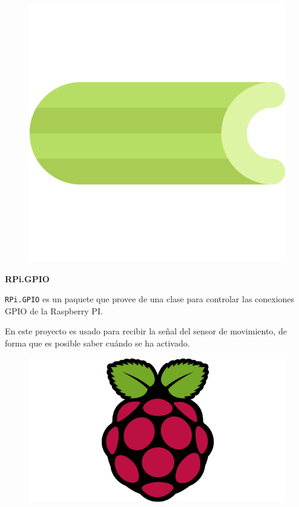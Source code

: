 \begin{figure}[h]
	\centering
	\includegraphics[scale=0.15]{images/14}
\end{figure}

\vspace{-1.4cm}

\textbf{RPi.GPIO}

\texttt{RPi.GPIO} \cite{ref16} es un paquete que provee de una clase para controlar las conexiones GPIO de la Raspberry PI.

En este proyecto es usado para recibir la señal del sensor de movimiento, de forma que es posible saber cuándo se ha activado.

\begin{figure}[h]
	\centering
	\includegraphics[scale=0.15]{images/15}
\end{figure}


